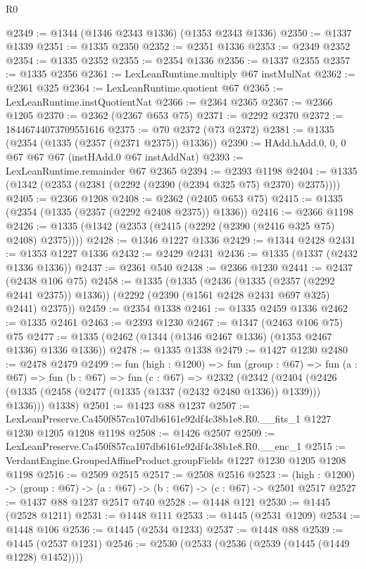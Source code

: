 \begin{lexlean}{R0}
\begin{coremodule}
@2349 := @1344 (@1346 @2343 @1336) (@1353 @2343 @1336)
@2350 := @1337 @1339
@2351 := @1335 @2350
@2352 := @2351 @1336
@2353 := @2349 @2352
@2354 := @1335 @2352
@2355 := @2354 @1336
@2356 := @1337 @2355
@2357 := @1335 @2356
@2361 := LexLeanRuntime.multiply @67 instMulNat
@2362 := @2361 @325
@2364 := LexLeanRuntime.quotient @67
@2365 := LexLeanRuntime.instQuotientNat
@2366 := @2364 @2365
@2367 := @2366 @1205
@2370 := @2362 (@2367 @653 @75)
@2371 := @2292 @2370
@2372 := 18446744073709551616
@2375 := @70 @2372 (@73 @2372)
@2381 := @1335 (@2354 (@1335 (@2357 (@2371 @2375)) @1336))
@2390 := HAdd.hAdd.{0, 0, 0} @67 @67 @67 (instHAdd.{0} @67 instAddNat)
@2393 := LexLeanRuntime.remainder @67 @2365
@2394 := @2393 @1198
@2404 := @1335 (@1342 (@2353 (@2381 (@2292 (@2390 (@2394 @325 @75) @2370) @2375))))
@2405 := @2366 @1208
@2408 := @2362 (@2405 @653 @75)
@2415 := @1335 (@2354 (@1335 (@2357 (@2292 @2408 @2375)) @1336))
@2416 := @2366 @1198
@2426 := @1335 (@1342 (@2353 (@2415 (@2292 (@2390 (@2416 @325 @75) @2408) @2375))))
@2428 := @1346 @1227 @1336
@2429 := @1344 @2428
@2431 := @1353 @1227 @1336
@2432 := @2429 @2431
@2436 := @1335 (@1337 (@2432 @1336 @1336))
@2437 := @2361 @540
@2438 := @2366 @1230
@2441 := @2437 (@2438 @106 @75)
@2458 := @1335
    (@1335
      (@2436 (@1335 (@2357 (@2292 @2441 @2375)) @1336))
      (@2292 (@2390 (@1561 @2428 @2431 @697 @325) @2441) @2375))
@2459 := @2354 @1338
@2461 := @1335 @2459 @1336
@2462 := @1335 @2461
@2463 := @2393 @1230
@2467 := @1347 (@2463 @106 @75) @75
@2477 := @1335 (@2462 (@1344 (@1346 @2467 @1336) (@1353 @2467 @1336) @1336 @1336))
@2478 := @1335 @1338
@2479 := @1427 @1230
@2480 := @2478 @2479
@2499 := fun (high : @1200) =>
  fun (group : @67) =>
  fun (a : @67) =>
  fun (b : @67) =>
  fun (c : @67) =>
  @2332
    (@2342
      (@2404 (@2426 (@1335 (@2458 (@2477 (@1335 (@1337 (@2432 @2480 @1336)) @1339))) @1336)))
      @1338)
@2501 := @1423 @88 @1237
@2507 := LexLeanPreserve.Ca450f857ca107db6161e92df4c38b1e8.R0.__fits_1 @1227 @1230 @1205 @1208 @1198
@2508 := @1426 @2507
@2509 := LexLeanPreserve.Ca450f857ca107db6161e92df4c38b1e8.R0.__enc_1
@2515 := VerdantEngine.GroupedAffineProduct.groupFields @1227 @1230 @1205 @1208 @1198
@2516 := @2509 @2515
@2517 := @2508 @2516
@2523 := (high : @1200) -> (group : @67) -> (a : @67) -> (b : @67) -> (c : @67) -> @2501 @2517
@2527 := @1437 @88 @1237 @2517 @740
@2528 := @1448 @121
@2530 := @1445 (@2528 @1211)
@2531 := @1448 @111
@2533 := @1445 (@2531 @1209)
@2534 := @1448 @106
@2536 := @1445 (@2534 @1233)
@2537 := @1448 @88
@2539 := @1445 (@2537 @1231)
@2546 := @2530 (@2533 (@2536 (@2539 (@1445 (@1449 @1228) @1452))))

\end{coremodule}
\end{lexlean}
